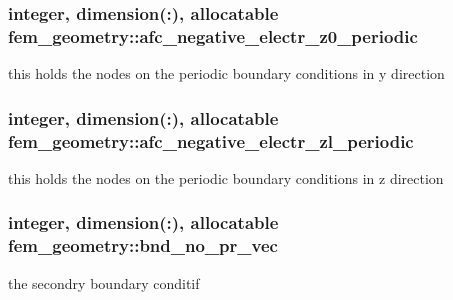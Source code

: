 \subsubsection[{afc\+\_\+negative\+\_\+electr\+\_\+z0\+\_\+periodic}]{\setlength{\rightskip}{0pt plus 5cm}integer, dimension(\+:), allocatable fem\+\_\+geometry\+::afc\+\_\+negative\+\_\+electr\+\_\+z0\+\_\+periodic}\label{classfem__geometry_a9a7514f02cd379a92b365cf0ef34b9c6}


this holds the nodes on the periodic boundary conditions in y direction 

\hypertarget{classfem__geometry_a7181cf59ccf713bf86aada8c3a7a3901}{}
\subsubsection[{afc\+\_\+negative\+\_\+electr\+\_\+zl\+\_\+periodic}]{\setlength{\rightskip}{0pt plus 5cm}integer, dimension(\+:), allocatable fem\+\_\+geometry\+::afc\+\_\+negative\+\_\+electr\+\_\+zl\+\_\+periodic}\label{classfem__geometry_a7181cf59ccf713bf86aada8c3a7a3901}


this holds the nodes on the periodic boundary conditions in z direction 

\hypertarget{classfem__geometry_a4629a0d999e34a1547afb75c9a64bcf5}{}
\subsubsection[{bnd\+\_\+no\+\_\+pr\+\_\+vec}]{\setlength{\rightskip}{0pt plus 5cm}integer, dimension(\+:), allocatable fem\+\_\+geometry\+::bnd\+\_\+no\+\_\+pr\+\_\+vec}\label{classfem__geometry_a4629a0d999e34a1547afb75c9a64bcf5}


the secondry boundary conditif 

\hypertarget{classfem__geometry_acf0254abaafe358f825a34f402babb1f}{}
